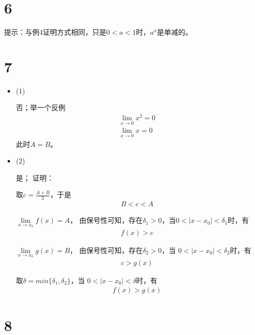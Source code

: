 \documentclass{article}
\begin{document}
\section*{6}

提示：与例4证明方式相同，只是$0 < a < 1$时，$a^x$是单减的。

\section*{7}

\begin{itemize}
  \item (1)

        否；举一个反例
        \begin{align*}
          \lim\limits_{x \to 0} x^2 = 0 \\
          \lim\limits_{x \to 0} x = 0
        \end{align*}
        此时$A = B$。

  \item (2)

        是；
        证明：

        取$c = \frac{A + B}{2}$，于是
        \begin{align*}
          B < c < A
        \end{align*}

        $\lim\limits_{x \to x_0} f(x) = A$，
        由保号性可知，存在$\delta_1 > 0$，当$ 0 < |x - x_0| < \delta_1$时，有
        \begin{align*}
          f(x) > c
        \end{align*}

        $\lim\limits_{x \to x_0} g(x) = B$，
        由保号性可知，存在$\delta_2 > 0$，当 $ 0 < |x - x_0| < \delta_2$时，有
        \begin{align*}
          c > g(x)
        \end{align*}

        取$\delta = min\{\delta_1, \delta_2\}$，当 $ 0< |x - x_0| < \delta$时，有
        \begin{align*}
          f(x) > g(x)
        \end{align*}
\end{itemize}

\section*{8}
\end{document}

